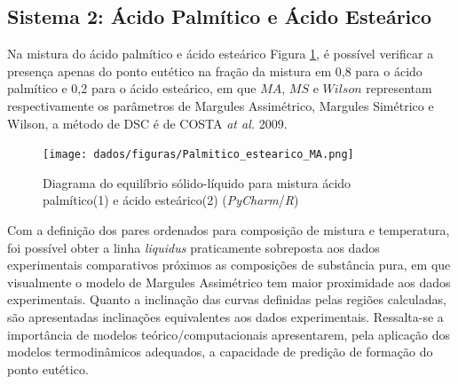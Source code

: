 

\subsection{Sistema 2: Ácido Palmítico e Ácido Esteárico}\label{sistema3}

Na mistura do ácido palmítico e ácido esteárico Figura \ref{fig:1}, é possível verificar a presença apenas do ponto eutético na fração da mistura em 0,8 para o ácido palmítico e 0,2 para o ácido esteárico, em que $MA$, $MS$ e $Wilson$ representam respectivamente os parâmetros de Margules Assimétrico, Margules Simétrico e Wilson, a método de DSC é de COSTA \textit{at al.} 2009.
\begin{figure}[H]
	\centering
	\texttt{[image: dados/figuras/Palmitico\_estearico\_MA.png]}
	\caption[Diagrama do equilíbrio sólido-líquido para mistura ácido palmítico e ácido esteárico]{Diagrama do equilíbrio sólido-líquido para mistura ácido palmítico(1) e ácido esteárico(2) (\textit{PyCharm}/\textit{R})}
	\label{fig:1}
\end{figure}

Com a definição dos pares ordenados para composição de mistura e temperatura,  foi possível obter a linha \textit{liquidus} praticamente sobreposta aos dados experimentais comparativos próximos as composições de substância pura, em que visualmente o modelo de Margules Assimétrico tem maior proximidade aos dados experimentais. Quanto a inclinação das curvas definidas pelas regiões calculadas, são apresentadas inclinações equivalentes aos dados experimentais.  Ressalta-se a importância de modelos teórico/computacionais apresentarem, pela aplicação dos modelos termodinâmicos adequados, a capacidade de predição de formação do ponto eutético.

